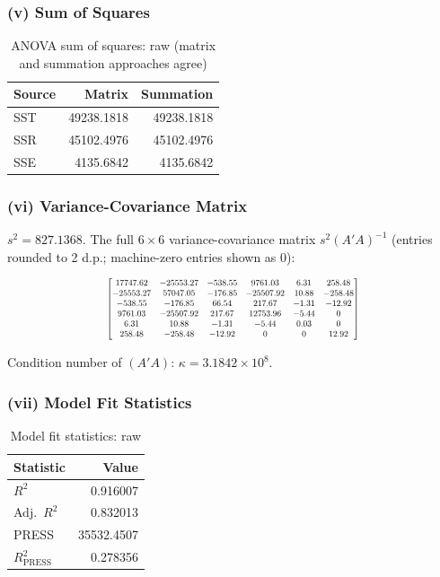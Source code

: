 \documentclass[12pt,a4paper]{article}
\begin{document}
\subsubsection{(v) Sum of Squares}

\begin{table}[H]
\centering
\caption{ANOVA sum of squares: raw (matrix and summation approaches agree)}
\begin{tabular}{lrr}
\toprule
Source & Matrix & Summation \\
\midrule
SST & 49238.1818 & 49238.1818 \\
SSR & 45102.4976 & 45102.4976 \\
SSE &  4135.6842 &  4135.6842 \\
\bottomrule
\end{tabular}
\end{table}

\subsubsection{(vi) Variance-Covariance Matrix}

$s^2 = 827.1368$. The full $6 \times 6$ variance-covariance matrix $s^2(A'A)^{-1}$
(entries rounded to 2 d.p.; machine-zero entries shown as 0):

\[
\scalebox{0.68}{$
\begin{bmatrix}
 17747.62 & -25553.27 &  -538.55 &   9761.03 &    6.31 &  258.48 \\
-25553.27 &  57047.05 &  -176.85 & -25507.92 &   10.88 & -258.48 \\
  -538.55 &   -176.85 &    66.54 &    217.67 &   -1.31 &  -12.92 \\
  9761.03 & -25507.92 &   217.67 &  12753.96 &   -5.44 &       0 \\
     6.31 &     10.88 &    -1.31 &     -5.44 &    0.03 &       0 \\
   258.48 &   -258.48 &   -12.92 &         0 &       0 &   12.92
\end{bmatrix}
$}
\]

Condition number of $(A'A)$: $\kappa = 3.1842 \times 10^{8}$.

\subsubsection{(vii) Model Fit Statistics}

\begin{table}[H]
\centering
\caption{Model fit statistics: raw}
\begin{tabular}{lr}
\toprule
Statistic & Value \\
\midrule
$R^2$                      & 0.916007 \\
Adj.\ $R^2$               & 0.832013 \\
PRESS                      & 35532.4507 \\
$R^2_{\text{PRESS}}$       & 0.278356 \\
\bottomrule
\end{tabular}
\end{table}
\end{document}
